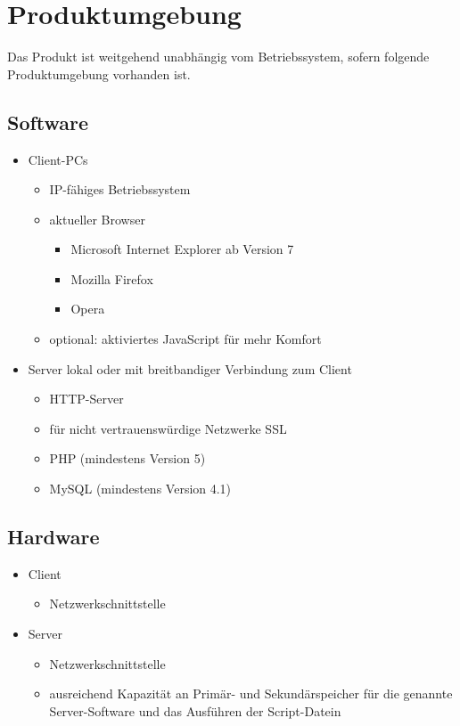 \documentclass[a4paper,oneside]{scrreprt}
\begin{document}
\chapter{Produktumgebung}

Das Produkt ist weitgehend unabhängig vom Betriebssystem, sofern folgende Produktumgebung vorhanden ist.

\section{Software}

\begin{itemize}
\item Client-PCs
    \begin{itemize}
    \item IP-fähiges Betriebssystem
    \item aktueller Browser
        \begin{itemize}
        \item Microsoft Internet Explorer ab Version 7
        \item Mozilla Firefox
        \item Opera
        \end{itemize}
    \item optional: aktiviertes JavaScript für mehr Komfort
    \end{itemize}

\item Server lokal oder mit breitbandiger Verbindung zum Client
    \begin{itemize}
    \item HTTP-Server
    \item für nicht vertrauenswürdige Netzwerke SSL
    \item PHP (mindestens Version 5)
    \item MySQL (mindestens Version 4.1)
    \end{itemize}
\end{itemize}

\section{Hardware}

\begin{itemize}
\item Client
    \begin{itemize}
    \item Netzwerkschnittstelle
    \end{itemize}
\item Server
    \begin{itemize}
    \item Netzwerkschnittstelle
    \item ausreichend Kapazität an Primär- und Sekundärspeicher für die genannte Server-Software und das Ausführen der Script-Datein
    \end{itemize}
\end{itemize}
\end{document}
